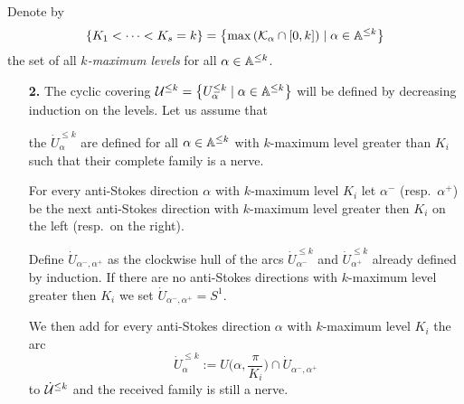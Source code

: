Denote by
\[
  \left\{K_1<\cdots<K_s=k\right\}
  =\left\{\max\left(\mathcal{K}_\alpha\cap[0,k]\right)\mid\alpha\in\mathbb{A}^{\leq k}\right\}
\]
the set of all \emph{$k$-maximum levels} for all $\alpha\in\mathbb{A}^{\leq k}$.
\begin{itemize}
\item[\textbf{2.}] The cyclic covering
  $\mathcal{U}^{\leq k}=\left\{U_\alpha^{\leq k}\mid\alpha\in\mathbb{A}^{\leq k}\right\}$
  will be defined by decreasing induction on the levels.
  Let us assume that
  \begin{einr}
    the $\dot U_\alpha^{\leq k}$ are defined for all $\alpha\in\mathbb{A}^{\leq k}$ with
    $k$-maximum level greater than $K_i$ such that their complete family is a
    nerve.
  \end{einr}
  For every anti-Stokes direction $\alpha$ with $k$-maximum level $K_i$ let
  $\alpha^-$ (resp.\ $\alpha^+$) be the next anti-Stokes direction with
  $k$-maximum level greater then $K_i$ on the left (resp.\ on the right).

  Define $\dot U_{\alpha^-,\alpha^+}$ as the clockwise hull of the arcs
  $\dot U_{\alpha^-}^{\leq k}$ and $\dot U_{\alpha^+}^{\leq k}$ already defined
  by induction.
  If there are no anti-Stokes directions with $k$-maximum level greater then
  $K_i$ we set $\dot U_{\alpha^-,\alpha^+}=S^1$.

  We then add for every anti-Stokes direction $\alpha$ with $k$-maximum level
  $K_i$ the arc
  \[
    \dot U_\alpha^{\leq k}
    :=U\bigl(\alpha,\frac{\pi}{K_i}\bigr)\cap\dot U_{\alpha^-,\alpha^+}
  \]
  to $\dot{\mathcal{U}}^{\leq k}$ and the received family is still a nerve.
  \begin{figure}[h]
    \begin{center}
\end{center}
\end{figure}
\end{itemize}
